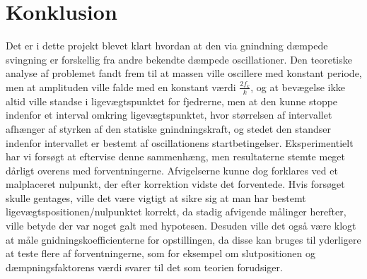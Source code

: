 \chapter{Konklusion}
Det er i dette projekt blevet klart hvordan at den via gnindning dæmpede svingning er forskellig fra andre bekendte dæmpede oscillationer.
Den teoretiske analyse af problemet fandt frem til at massen ville oscillere med konstant periode, men at amplituden ville falde med en konstant værdi $\frac{2f_k}{k}$, og at bevægelse ikke altid ville standse i ligevægtspunktet for fjedrerne, 
men at den kunne stoppe indenfor et interval omkring ligevægtspunktet, hvor størrelsen af intervallet afhænger af styrken af den statiske gnindningskraft, og stedet den standser indenfor intervallet er bestemt af oscillationens startbetingelser.
Eksperimentielt har vi forsøgt at eftervise denne sammenhæng, men resultaterne stemte meget dårligt overens med forventningerne. Afvigelserne kunne dog forklares ved et malplaceret nulpunkt, der efter korrektion vidste det forventede. 
Hvis forsøget skulle gentages, ville det være vigtigt at sikre sig at man har bestemt ligevægtspositionen/nulpunktet korrekt, da stadig afvigende målinger herefter, ville betyde der var noget galt med hypotesen. 
Desuden ville det også være klogt at måle gnidningskoefficienterne for opstillingen, 
da disse kan bruges til yderligere at teste flere af forventningerne, 
som for eksempel om slutpositionen og dæmpningsfaktorens værdi svarer til det som teorien forudsiger. 
